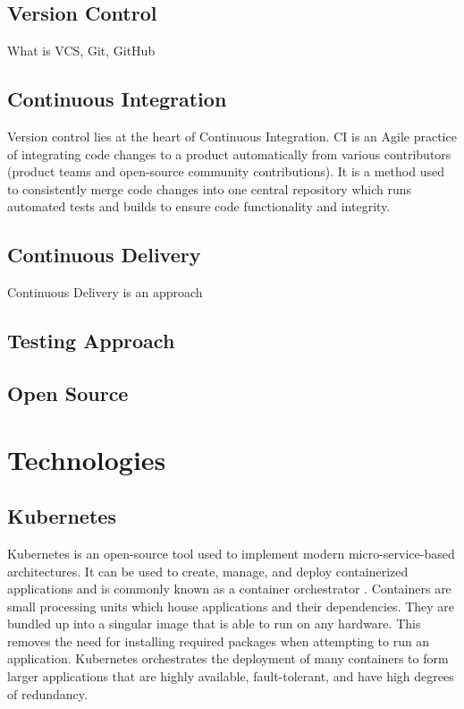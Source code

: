 \documentclass{article}
\begin{document}
\subsection{Version Control}
What is VCS, Git, GitHub 



\subsection{Continuous Integration}
Version control lies at the heart of Continuous Integration. CI is an Agile practice of integrating code changes to a product automatically from various contributors (product teams and open-source community contributions). It is a method used to consistently merge code changes into one central repository which runs automated tests and builds to ensure code functionality and integrity.   



\subsection{Continuous Delivery}
Continuous Delivery is an approach 



\subsection{Testing Approach}



\subsection{Open Source}



\section{Technologies} \label{technologies} 



\subsection{Kubernetes}

Kubernetes is an open-source tool used to implement modern micro-service-based architectures. It can be used to create, manage, and deploy containerized applications and is commonly known as a container orchestrator \cite{k8s-overview}. Containers are small processing units which house applications and their dependencies. They are bundled up into a singular image that is able to run on any hardware. This removes the need for installing required packages when attempting to run an application. Kubernetes orchestrates the deployment of many containers to form larger applications that are highly available, fault-tolerant, and have high degrees of redundancy.
\end{document}
